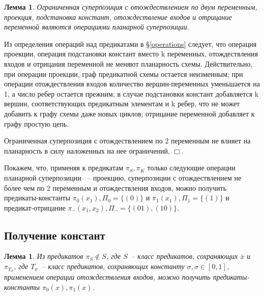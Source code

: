 \documentclass[12pt]{article}
\newtheorem{lemma}[theorem]{Лемма}
\newenvironment{proof}[1][Доказательство]{\begin{trivlist}
\item[\hskip \labelsep {\bfseries #1}]}{\end{trivlist}}
\begin{document}
\begin{lemma}
\label{lemma_planar_ops}
Ограниченная суперпозиция с отождествлением по двум переменным, проекция,
подстановка констант, отождествление входов и отрицание переменной являются операциями планарной суперпозиции.
\end{lemma}
\begin{proof}
Из определения операций над предикатами в \S \ref{operations} следует, что операция проекции, операция подстановки
констант вместо k переменных, отождествления входов и отрицания переменной не меняют планарность схемы. 
Действительно, при операции проекции, граф предикатной схемы остается неизменным; 
при операции отождествления входов количество вершин-переменных уменьшается на 1, а число ребер остается прежним;
в случае подстановки констант добавляется k вершин, соответствующих предикатным элементам
и k ребер, что не может добавить к графу схемы даже новых циклов;
отрицание переменной добавляет к графу простую цепь. 

Ограниченная суперпозиция с отождествлением по 2 переменным не влияет на планарность в силу наложенных на
нее ограничений, 
$\Box$.
\end{proof}

Покажем, что, применяя к предикатам $\pi_S, \pi_K$ только следующие операции планарной суперпозиции ~-- проекцию,
суперпозиции с отождествлением не более чем по 2 переменным и отождествления входов, 
можно получить предикаты-константы
$\pi_0(x_1), \Pi_0=\{ (0) \}$ и $\pi_1(x_1), \Pi_1=\{ (1) \}$ и предикат-отрицание 
$\pi_{\neg}(x_1, x_2), \Pi_{\neg}=\{ (01), (10) \}$.

\subsection{Получение констант}
\begin{lemma}
\label{eq:const}
Из предикатов $\pi_S \notin S$, где $S$~-- класс предикатов, сохраняющих $\bar{x}$ и $\pi_{T_{\sigma}}$, где 
$T_{\sigma}$~-- класс предикатов, сохраняющих константу $\sigma, \sigma \in [0, 1]$,
применением операции отождествления входов,
можно получить предикаты-константы $\pi_0(x), \pi_1(x)$.
\end{lemma}
\end{document}

